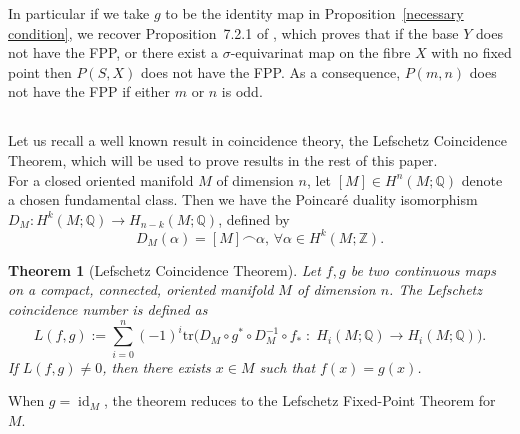 \documentclass{amsart}
\newtheorem{theorem}{Theorem}[section]
\newcommand{\propref}[1]{Proposition~\ref{#1}}
\begin{document}
		In particular if we take $g$ to be the identity map in \propref{necessary condition}, we recover Proposition~7.2.1 of \cite{mandal}, which proves that if the base $Y$ does not have the FPP, or there exist a $\sigma$-equivarinat map on the fibre $X$ with no fixed point then $P(S,X)$ does not have the FPP. As a consequence, $P(m,n)$ does not have the FPP if either $m$ or $n$ is odd.
	
	\subsection{} Let us recall a well known result in coincidence theory, the Lefschetz Coincidence Theorem, which will be used to prove results in the rest of this paper.\\
	
	For a closed oriented manifold $M$ of dimension $n$, let $[M]\in H^n(M;\mathbb Q)$ denote a chosen fundamental class. Then we have the Poincar\'e  duality isomorphism $D_M:H^k(M;\mathbb Q)\to H_{n-k}(M;\mathbb Q)$, defined by 
	\begin{equation}\label{poinc dua}
		D_M(\alpha)=[M]\frown \alpha, \, \forall \alpha\in H^k(M;\mathbb Z).
	\end{equation}

	
	\begin{theorem}[Lefschetz Coincidence Theorem]\label{LCT}
		Let $f,g$ be two continuous maps on a compact, connected, oriented manifold $M$ of  dimension $n$. The Lefschetz coincidence number is defined as 
		$$L(f,g):= \sum_{i=0}^{n} (-1)^i \mathrm{tr}\big(D_M \circ g^* \circ D_M^{-1} \circ f_* \; : \; H_i(M;\mathbb{Q}) \longrightarrow H_i(M;\mathbb{Q})\big).
		$$ If $L(f,g) \neq 0$, then there exists $x \in M$ such that $f(x) = g(x)$.
	\end{theorem}
	When  $g=\operatorname{id}_M$, the theorem reduces to the Lefschetz Fixed-Point Theorem for $M$.\\
	
\end{document}
